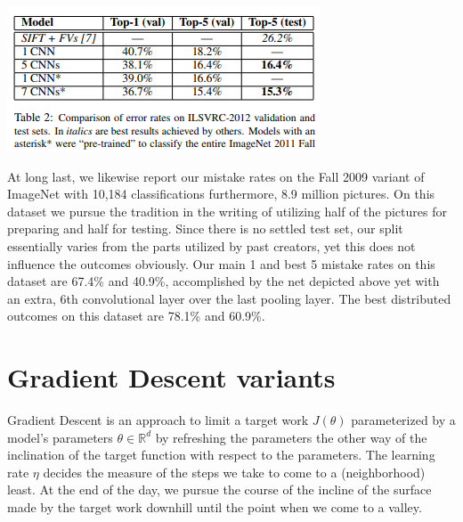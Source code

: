 \documentclass[12pt]{article}
\begin{document}
\begin{center}
\includegraphics[scale=1]{t2}
\end{center}
\hspace*{10mm}At long last, we likewise report our mistake rates on the Fall 2009 variant of ImageNet with 10,184 classifications furthermore, 8.9 million pictures. On this dataset we pursue the tradition in the writing of utilizing half of the pictures for preparing and half for testing. Since there is no settled test set, our split essentially varies from the parts utilized by past creators, yet this does not influence the outcomes obviously. Our main 1 and best 5 mistake rates on this dataset are 67.4\% and 40.9\%, accomplished by the net depicted above yet with an extra, 6th convolutional layer over the last pooling layer. The best distributed outcomes on this dataset are 78.1\% and 60.9\%.


\section*{Gradient Descent variants}
\hspace*{10mm}Gradient Descent is an approach to limit a target work $J(\theta)$ parameterized by a model's parameters $\theta \in \mathbb{R}^d$ by refreshing the parameters the other way of the inclination of the target function  with respect to the parameters. The learning rate $\eta$ decides the measure of the steps we take to come to a (neighborhood) least. At the end of the day, we pursue the course of the incline of the surface made by the target work downhill until the point when we come to a valley.\\
\end{document}
